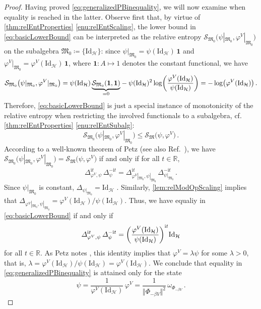 \documentclass[a4paper, twoside, 11pt, reqno]{amsart}
\theoremstyle{definition}
\theoremstyle{plain}
\let\originalleft\left
\let\originalright\right
\renewcommand{\left}{\mathopen{}\mathclose\bgroup\originalleft}
\renewcommand{\right}{\aftergroup\egroup\originalright}
\renewcommand{\Delta}{\varDelta}
\renewcommand{\Phi}{\varPhi}
\newcommand{\R}{\mathbb{R}}
\newcommand{\MH}{\mathcal{H}}
\newcommand{\MS}{\mathcal{S}}
\newcommand{\MFM}{\mathfrak{M}}
\newcommand{\ii}{\mathrm{i}}
\newcommand{\id}{\mathrm{Id}}
\newcommand{\1}{\mathbf{1}}
\newcommand{\set}[2][]{#1\{{#2}#1\}}
\newcommand{\norm}[2][]{#1\Vert{#2}#1\Vert}
\newcommand{\ce}{\coloneqq}
\begin{document}
\begin{proof}
    Having proved \cref{eq:generalizedPBinequality}, we will now examine when equality is reached in the latter. Observe first that, by virtue of \cref{thm:relEntProperties} \ref{enu:relEntScaling}, the lower bound in \cref{eq:basicLowerBound} can be interpreted as the relative entropy $\MS_{\MFM_0} \bigl(\psi|_{\MFM_0}, \varphi^V|_{\MFM_0}\bigr)$ on the subalgebra $\MFM_0 \ce \set{\id_\MH}$: since $\psi|_{\MFM_0} = \psi(\id_\MH) \, \1$ and $\varphi^V|_{\MFM_0} = \varphi^V(\id_\MH) \, \1$, where $\1 : A \mapsto 1$ denotes the constant functional, we have
    \begin{equation*}
        \MS_{\MFM_0} \bigl(\psi|_{\MFM_0}, \varphi^V|_{\MFM_0}\bigr) = \psi(\id_\MH) \, \mathord{\underbrace{\MS_{\MFM_0}(\1, \1)}_{=0}} - \psi(\id_\MH)^2 \log \left(\frac{\varphi^V(\id_\MH)}{\psi(\id_\MH)}\right) = - \log \bigl(\varphi^V(\id_\MH)\bigr) \, .
    \end{equation*}
    Therefore, \cref{eq:basicLowerBound} is just a special instance of monotonicity of the relative entropy when restricting the involved functionals to a subalgebra, cf. \cref{thm:relEntProperties} \ref{enu:relEntSubalg}:
    \begin{equation*}
        \MS_{\MFM_0} \bigl(\psi|_{\MFM_0}, \varphi^V|_{\MFM_0}\bigr) \le \MS_\MFM \bigl(\psi, \varphi^V\bigr) \, .
    \end{equation*}
    According to a well-known theorem of Petz \cite[Thm. 4]{Petz1986b} (see also Ref.~\cite[Thm. 9.3]{OP2004}), we have $\MS_{\MFM_0} \bigl(\psi|_{\MFM_0}, \varphi^V|_{\MFM_0}\bigr) = \MS_\MFM \bigl(\psi, \varphi^V\bigr)$ if and only if for all $t \in \R$,
    \begin{equation*}
        \Delta_{\varphi^V, \psi}^{\ii t} \, \Delta_{\psi}^{- \ii t} = \Delta_{\varphi^V|_{\MFM_0}, \psi|_{\MFM_0}}^{\ii t} \, \Delta_{\psi|_{\MFM_0}}^{- \ii t} \, .
    \end{equation*}
    Since $\psi|_{\MFM_0}$ is constant, $\Delta_{\psi|_{\MFM_0}} = \id_\MH$ \cite[Exa. 2.4]{Hiai2021}. Similarly, \cref{lem:relModOpScaling} implies that $\Delta_{\varphi^V|_{\MFM_0}, \psi|_{\MFM_0}} = \varphi^V(\id_\MH) / \psi(\id_\MH)$. Thus, we have equaliy in \cref{eq:basicLowerBound} if and only if
    \begin{equation*}
        \Delta_{\varphi^V, \psi}^{\ii t} \, \Delta_{\psi}^{- \ii t} = \left(\frac{\varphi^V(\id_\MH)}{\psi(\id_\MH)}\right)^{\ii t} \id_\MH
    \end{equation*}
    for all $t \in \R$. As Petz notes \cite[Prop. 1, p. 346]{Petz1988}, this identity implies that $\varphi^V = \lambda \psi$ for some $\lambda > 0$, that is, $\lambda = \varphi^V(\id_\MH) / \psi(\id_\MH) = \varphi^V(\id_\MH)$. We conclude that equality in \cref{eq:generalizedPBinequality} is attained only for the state
    \begin{equation*}
        \psi = \frac{1}{\varphi^V(\id_\MH)} \, \varphi^V = \frac{1}{\norm{\Phi_{- \beta V}}^2} \, \omega_{\Phi_{- \beta V}} \, .
    \end{equation*}
    

\end{proof}
\end{document}
